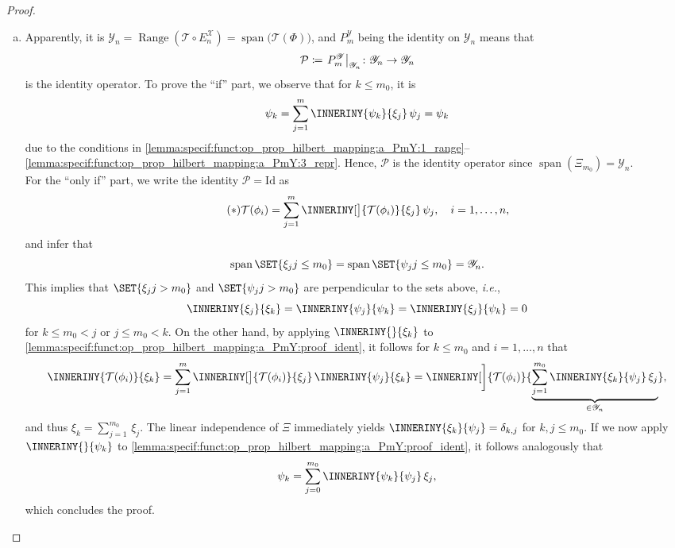 \documentclass[a4paper]{paper}
\newcommand*{\SPC}[1]{{\ensuremath{\mathscr{#1}}}}
\newcommand*{\SPCY}{\SPC{Y}}
\newcommand*{\OP}[1]{{\ensuremath{\mathcal{#1}}}}
\newcommand*{\OPP}{\OP{P}}
\newcommand*{\OPT}{\OP{T}}
\newcommand*{\OPID}{\OP{\mathrm{Id}}}
\newcommand*{\EXT}[2]{\ensuremath{E_{#1}^{#2}}}
\newcommand*{\PROJ}[2]{\ensuremath{P_{#1}^{#2}}}
\newcommand*{\EnX}{{\ensuremath{\EXT{n}{\SPC{X}}}}}
\newcommand*{\PmY}{{\ensuremath{\PROJ{m}{\SPCY}}}}
\providecommand\GIVEN{}  %
\DeclareMathOperator{\RANGE}{Range}
\DeclareMathOperator{\SPAN}{span}
\newcommand*{\FUNCRESTR}[2]{{\ensuremath{\left. \vphantom{g_{g_g}} {#1} \right|_{#2}}}}
\newcommand{\ie}{\textsl{i.e.}\xspace}
\begin{document}
\begin{proof}~
 \begin{enumerate}[(a)]
  \item Apparently, it is $\SPCY_n = \RANGE(\OPT \circ \EnX) = \SPAN\big( \OPT(\Phi) \big)$, and $\PmY$ being the 
  identity on $\SPCY_n$ means that
  \begin{equation*}
   \OPP \coloneqq \FUNCRESTR{\PmY}{\SPCY_n} \colon \SPCY_n \to \SPCY_n
  \end{equation*}
  is the identity operator. To prove the ``if'' part, we observe that for $k\leq m_0$, it is
  \begin{equation*}
   \psi_k = \sum_{j=1}^m \INNERINY{\psi_k}{\xi_j}\, \psi_j = \psi_k
  \end{equation*}
  due to the conditions in 
  \eqref{lemma:specif:funct:op_prop_hilbert_mapping:a_PmY:1_range}--%
  \eqref{lemma:specif:funct:op_prop_hilbert_mapping:a_PmY:3_repr}.
  Hence, $\OPP$ is the identity operator since $\SPAN(\Xi_{m_0}) = \SPCY_n$. \\
  For the ``only if'' part, we write the identity $\OPP = \OPID$ as
  \begin{equation}
   \label{lemma:specif:funct:op_prop_hilbert_mapping:a_PmY:proof_ident}
   \tag{{$\ast$}}
   \OPT(\phi_i) 
   = \sum_{j=1}^m \INNERINY[\big]{\OPT(\phi_i)}{\xi_j}\, \psi_j, \quad i=1,\dotsc,n,
  \end{equation}
  and infer that
  \begin{equation*}
   \SPAN\SET{ \xi_j \GIVEN j\leq m_0 } = \SPAN\SET{ \psi_j \GIVEN j\leq m_0 } = \SPCY_n.
  \end{equation*}
  This implies that $\SET{ \xi_j \GIVEN j > m_0 }$ and $\SET{ \psi_j \GIVEN j > m_0 }$ are perpendicular to the sets 
  above, \ie,
  \begin{equation*}
   \INNERINY{\xi_j}{\xi_k} = \INNERINY{\psi_j}{\psi_k} = \INNERINY{\xi_j}{\psi_k} = 0
  \end{equation*}
  for $k \leq m_0 < j$ or $j \leq m_0 < k$. On the other hand, by applying $\INNERINY{}{\xi_k}$ to 
  \eqref{lemma:specif:funct:op_prop_hilbert_mapping:a_PmY:proof_ident}, it follows for $k \leq m_0$ and $i=1,\dotsc,n$ 
  that
  \begin{equation*}
   \INNERINY{\OPT(\phi_i)}{\xi_k}
   = \sum_{j=1}^m \INNERINY[\big]{\OPT(\phi_i)}{\xi_j}\, \INNERINY{\psi_j}{\xi_k}
   = \INNERINY[\bigg]{\OPT(\phi_i)}{\underbrace{\sum_{j=1}^{m_0} \INNERINY{\xi_k}{\psi_j}\, \xi_j}_{\in \SPCY_n}},
  \end{equation*}
  and thus $\xi_k = \sum_{j=1}^{m_0} \, \xi_j$. The linear independence of $\Xi$ 
  immediately yields $\INNERINY{\xi_k}{\psi_j} = \delta_{k,j}$ for $k,j \leq m_0$. If we now apply
  $\INNERINY{}{\psi_k}$ to \eqref{lemma:specif:funct:op_prop_hilbert_mapping:a_PmY:proof_ident}, it follows analogously 
  that
  \begin{equation*}
   \psi_k = \sum_{j=0}^{m_0} \INNERINY{\psi_k}{\psi_j}\, \xi_j,
  \end{equation*}
  which concludes the proof.
  

\end{enumerate}
\end{proof}
\end{document}
